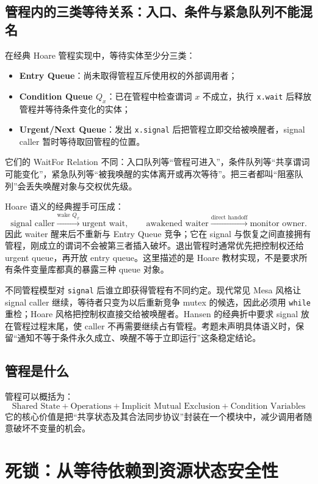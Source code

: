 \documentclass[11pt,a4paper]{ctexart}
\newcommand{\kw}[1]{\textbf{#1}}
\newcommand{\code}[1]{\texttt{#1}}
\begin{document}
\subsection{管程内的三类等待关系：入口、条件与紧急队列不能混名}

在经典 Hoare 管程实现中，等待实体至少分三类：
\begin{itemize}
\item \kw{Entry Queue}：尚未取得管程互斥使用权的外部调用者；
\item \kw{Condition Queue $Q_x$}：已在管程中检查谓词 $x$ 不成立，执行 \code{x.wait} 后释放管程并等待条件变化的实体；
\item \kw{Urgent/Next Queue}：发出 \code{x.signal} 后把管程立即交给被唤醒者，signal caller 暂时等待取回管程的位置。
\end{itemize}
它们的 WaitFor Relation 不同：入口队列等“管程可进入”，条件队列等“共享谓词可能变化”，紧急队列等“被我唤醒的实体离开或再次等待”。把三者都叫“阻塞队列”会丢失唤醒对象与交权优先级。

Hoare 语义的经典握手可压成：
\[
\text{signal caller}\xrightarrow{\text{wake }Q_x}\text{urgent wait},
\qquad
\text{awakened waiter}\xrightarrow{\text{direct handoff}}\text{monitor owner}.
\]
因此 waiter 醒来后不重新与 Entry Queue 竞争；它在 signal 与恢复之间直接拥有管程，刚成立的谓词不会被第三者插入破坏。退出管程时通常优先把控制权还给 urgent queue，再开放 entry queue。这里描述的是 Hoare 教材实现，不是要求所有条件变量库都真的暴露三种 queue 对象。

\begin{eng}
不同管程模型对 \code{signal} 后谁立即获得管程有不同约定。现代常见 Mesa 风格让 signal caller 继续，等待者只变为以后重新竞争 mutex 的候选，因此必须用 \code{while} 重检；Hoare 风格把控制权直接交给被唤醒者。Hansen 的经典折中要求 signal 放在管程过程末尾，使 caller 不再需要继续占有管程。考题未声明具体语义时，保留“通知不等于条件永久成立、唤醒不等于立即运行”这条稳定结论。
\end{eng}

\subsection{管程是什么}

管程可以概括为：
\[
\boxed{
\text{Shared State}
+
\text{Operations}
+
\text{Implicit Mutual Exclusion}
+
\text{Condition Variables}
}
\]
它的核心价值是把“共享状态及其合法同步协议”封装在一个模块中，减少调用者随意破坏不变量的机会。

\section{死锁：从等待依赖到资源状态安全性}
\end{document}
